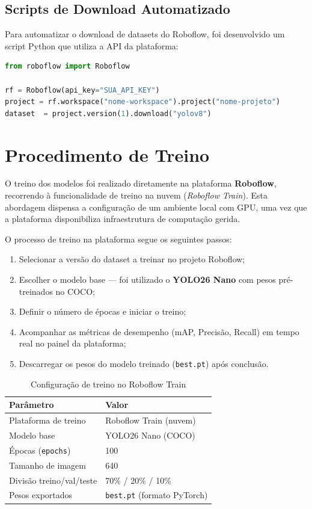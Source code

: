 \subsection{Scripts de Download Automatizado}

Para automatizar o download de datasets do Roboflow, foi desenvolvido um
script Python que utiliza a API da plataforma:

\begin{lstlisting}[language=Python, caption={Download automático de dataset via API Roboflow}]
from roboflow import Roboflow

rf = Roboflow(api_key="SUA_API_KEY")
project = rf.workspace("nome-workspace").project("nome-projeto")
dataset  = project.version(1).download("yolov8")
\end{lstlisting}

\section{Procedimento de Treino}

O treino dos modelos foi realizado diretamente na plataforma \textbf{Roboflow},
recorrendo à funcionalidade de treino na nuvem (\textit{Roboflow Train}).
Esta abordagem dispensa a configuração de um ambiente local com GPU,
uma vez que a plataforma disponibiliza infraestrutura de computação gerida.

O processo de treino na plataforma segue os seguintes passos:

\begin{enumerate}
  \item Selecionar a versão do dataset a treinar no projeto Roboflow;
  \item Escolher o modelo base — foi utilizado o \textbf{YOLO26 Nano} com pesos
    pré-treinados no COCO;
  \item Definir o número de épocas e iniciar o treino;
  \item Acompanhar as métricas de desempenho (mAP, Precisão, Recall) em
    tempo real no painel da plataforma;
  \item Descarregar os pesos do modelo treinado (\texttt{best.pt}) após
    conclusão.
\end{enumerate}

\begin{table}[H]
  \centering
  \caption{Configuração de treino no Roboflow Train}
  \label{tab:hyperparams}
  \begin{tabular}{ll}
    \toprule
    \textbf{Parâmetro}       & \textbf{Valor} \\
    \midrule
    Plataforma de treino     & Roboflow Train (nuvem) \\
    Modelo base              & YOLO26 Nano (COCO) \\
    Épocas (\texttt{epochs}) & 100 \\
    Tamanho de imagem        & 640 \\
    Divisão treino/val/teste & 70\% / 20\% / 10\% \\
    Pesos exportados         & \texttt{best.pt} (formato PyTorch) \\
    \bottomrule
  \end{tabular}
\end{table}
